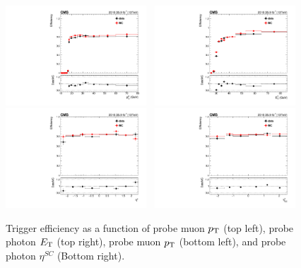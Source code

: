		\begin{figure}[p]
		  \centering
		    \includegraphics[width=0.47\textwidth]{Fig/Trigger/Eff_1D/Eff_ProbeMuonPt_DYJetsToLL_aMCatNLO}~
		    \includegraphics[width=0.47\textwidth]{Fig/Trigger/Eff_1D/Eff_ProbePhotonEt_DYJetsToLL_aMCatNLO}\\
		    \includegraphics[width=0.47\textwidth]{Fig/Trigger/Eff_1D/Eff_ProbeMuonEta_DYJetsToLL_aMCatNLO}~
		    \includegraphics[width=0.47\textwidth]{Fig/Trigger/Eff_1D/Eff_ProbePhotonSCEta_DYJetsToLL_aMCatNLO} \\
		    \caption[TrigEff PtEta]{Trigger efficiency as a function of probe muon $p_{\mathrm{T}}$ (top left), probe photon $E_{\mathrm{T}}$ (top right), probe muon $p_{\mathrm{T}}$ (bottom left), and probe photon $\eta^{SC}$ (Bottom right).}
		    \label{fig:Trigploteff}
		\end{figure}
		
